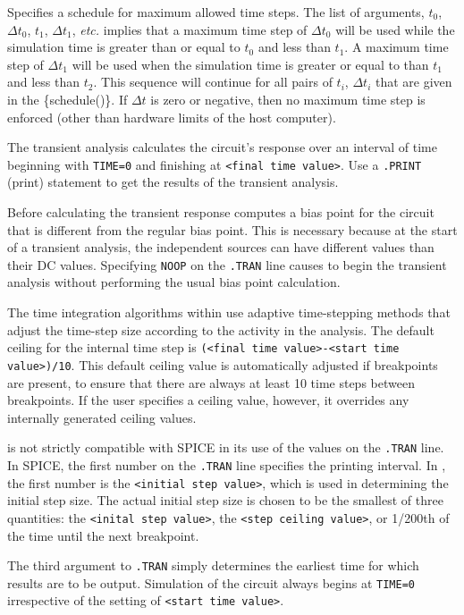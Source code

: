\begin{Command}
\begin{Arguments}

Specifies a schedule for maximum allowed time steps. The list of
arguments, $t_0$, $\Delta t_0$, $t_1$, $\Delta t_1$, \emph{ etc.\/}
implies that a maximum time step of $\Delta t_0$ will be used while the
simulation time is greater than or equal to $t_0$ and less than $t_1$.
A maximum time step of $\Delta t_1$ will be used when the simulation
time is greater or equal to than $t_1$ and less than $t_2$. This
sequence will continue for all pairs of $t_i$, $\Delta t_i$ that are
given in the \{schedule()\}.  If $\Delta t$ is zero or negative, then no
maximum time step is enforced (other than hardware limits of the host
computer).

\end{Arguments}

\comments

The transient analysis calculates the circuit's response over an
interval of time beginning with \texttt{TIME=0} and finishing at
\texttt{<final time value>}. Use a \texttt{.PRINT}
(print)
statement to get the results of the transient analysis.

Before calculating the transient response \Xyce{} computes a bias
point for the circuit that is different from the
regular bias point. This is necessary because at the start of a
transient analysis, the independent sources
can have different values than their DC values. Specifying \texttt{NOOP}
on the \texttt{.TRAN} line causes \Xyce{} to begin the transient
analysis without performing the usual bias point calculation.

The time integration algorithms within
\Xyce{} use adaptive time-stepping methods that adjust the time-step
size according to the activity in the
analysis. The default ceiling for the internal time step is
\texttt{(<final time value>-<start time value>)/10}.  This default
ceiling value is automatically adjusted if breakpoints are present, to
ensure that there are always at least 10 time steps between breakpoints.
If the user specifies a ceiling value, however, it overrides any
internally generated ceiling values.

\Xyce{} is not strictly compatible with SPICE in its use of the values on the
\texttt{.TRAN} line. In SPICE, the first number on the \texttt{.TRAN} line
specifies the printing interval. In \Xyce{}, the first number is the
\texttt{<initial step value>}, which is used in determining the initial step
size.  The actual initial step size is chosen to be the smallest of three
quantities: the \texttt{<inital step value>}, the \texttt{<step ceiling
value>}, or 1/200th of the time until the next breakpoint.

The third argument to \texttt{.TRAN} simply determines the earliest time
for which results are to be output.  Simulation of the circuit always
begins at \texttt{TIME=0} irrespective of the setting of \texttt{<start time value>}.

\end{Command}
